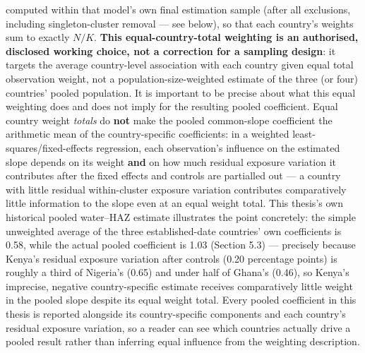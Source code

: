 computed within that model's own final estimation sample (after all exclusions, including singleton-cluster removal --- see below), so that each country's weights sum to exactly $N/K$. \textbf{This equal-country-total weighting is an authorised, disclosed working choice, not a correction for a sampling design}: it targets the average country-level association with each country given equal total observation weight, not a population-size-weighted estimate of the three (or four) countries' pooled population. It is important to be precise about what this equal weighting does and does not imply for the resulting pooled coefficient. Equal country weight \textit{totals} do \textbf{not} make the pooled common-slope coefficient the arithmetic mean of the country-specific coefficients: in a weighted least-squares/fixed-effects regression, each observation's influence on the estimated slope depends on its weight \textbf{and} on how much residual exposure variation it contributes after the fixed effects and controls are partialled out --- a country with little residual within-cluster exposure variation contributes comparatively little information to the slope even at an equal weight total. This thesis's own historical pooled water--HAZ estimate illustrates the point concretely: the simple unweighted average of the three established-date countries' own coefficients is 0.58, while the actual pooled coefficient is 1.03 (Section 5.3) --- precisely because Kenya's residual exposure variation after controls (0.20 percentage points) is roughly a third of Nigeria's (0.65) and under half of Ghana's (0.46), so Kenya's imprecise, negative country-specific estimate receives comparatively little weight in the pooled slope despite its equal weight total. Every pooled coefficient in this thesis is reported alongside its country-specific components and each country's residual exposure variation, so a reader can see which countries actually drive a pooled result rather than inferring equal influence from the weighting description.

